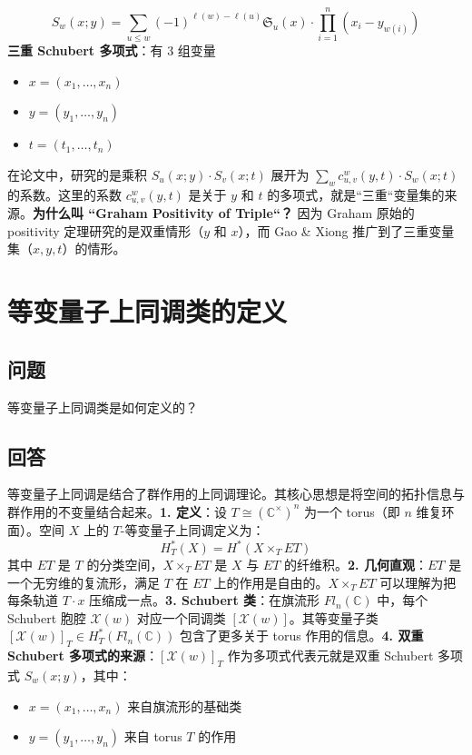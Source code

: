 $$S_w(x; y) = \sum_{u \leq w} (-1)^{\ell(w)-\ell(u)} \mathfrak{S}_u(x) \cdot \prod_{i=1}^n (x_i - y_{w(i)})$$\textbf{三重 Schubert 多项式}：有 3 组变量
\begin{itemize}
\item $x = (x_1, \ldots, x_n)$\item $y = (y_1, \ldots, y_n)$\item $t = (t_1, \ldots, t_n)$

\end{itemize}在论文中，研究的是乘积 $S_u(x; y) \cdot S_v(x; t)$ 展开为 $\sum_w c^w_{u,v}(y, t) \cdot S_w(x; t)$ 的系数。这里的系数 $c^w_{u,v}(y, t)$ 是关于 $y$ 和 $t$ 的多项式，就是``三重``变量集的来源。\textbf{为什么叫 ``Graham Positivity of Triple``？} 因为 Graham 原始的 positivity 定理研究的是双重情形（$y$ 和 $x$），而 Gao \& Xiong 推广到了三重变量集（$x, y, t$）的情形。
\section{等变量子上同调类的定义}\label{sec:EquivariantCohomologyClass}
\subsection{问题}
等变量子上同调类是如何定义的？
\subsection{回答}
等变量子上同调是结合了群作用的上同调理论。其核心思想是将空间的拓扑信息与群作用的不变量结合起来。\textbf{1. 定义}：设 $T \cong (\mathbb{C}^\times)^n$ 为一个 torus（即 $n$ 维复环面）。空间 $X$ 上的 $T$-等变量子上同调定义为：$$H_T^*(X) = H^*(X \times_T ET)$$其中 $ET$ 是 $T$ 的分类空间，$X \times_T ET$ 是 $X$ 与 $ET$ 的纤维积。\textbf{2. 几何直观}：$ET$ 是一个无穷维的复流形，满足 $T$ 在 $ET$ 上的作用是自由的。$X \times_T ET$ 可以理解为把每条轨道 $T \cdot x$ 压缩成一点。\textbf{3. Schubert 类}：在旗流形 $Fl_n(\mathbb{C})$ 中，每个 Schubert 胞腔 $\mathcal{X}(w)$ 对应一个同调类 $[\mathcal{X}(w)]$。其等变量子类 $[\mathcal{X}(w)]_T \in H_T^*(Fl_n(\mathbb{C}))$ 包含了更多关于 torus 作用的信息。\textbf{4. 双重 Schubert 多项式的来源}：$[\mathcal{X}(w)]_T$ 作为多项式代表元就是双重 Schubert 多项式 $S_w(x; y)$，其中：
\begin{itemize}
\item $x = (x_1, \ldots, x_n)$ 来自旗流形的基础类
\item $y = (y_1, \ldots, y_n)$ 来自 torus $T$ 的作用
\end{itemize}


